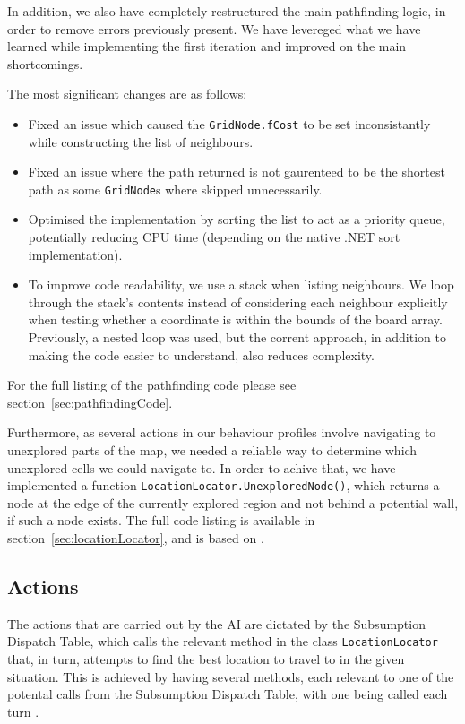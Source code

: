 \documentclass[11pt]{article}
\begin{document}
In addition, we also have completely restructured the main pathfinding logic, in order to remove errors previously present. We have levereged what we have learned while implementing the first iteration\cite{theGloriousWe} and improved on the main shortcomings.

The most significant changes are as follows:

\begin{itemize}
\item Fixed an issue which caused the \verb|GridNode.fCost| to be set inconsistantly while constructing the list of neighbours.
\item Fixed an issue where the path returned is not gaurenteed to be the shortest path as some \verb|GridNode|s where skipped unnecessarily.
\item Optimised the implementation by sorting the list to act as a priority queue, potentially reducing CPU time (depending on the native .NET sort implementation).
\item To improve code readability, we use a stack when listing neighbours. We loop through the stack's contents instead of considering each neighbour explicitly when testing whether a coordinate is within the bounds of the board array. Previously, a nested loop was used, but the corrent approach, in addition to making the code easier to understand, also reduces complexity.
\end{itemize}

For the full listing of the pathfinding code please see section~\ref{sec:pathfindingCode}.

Furthermore, as several actions in our behaviour profiles involve navigating to unexplored parts of the map, we needed a reliable way to determine which unexplored cells we could navigate to. In order to achive that, we have implemented a function \verb|LocationLocator.UnexploredNode()|, which returns a node at the edge of the currently explored region and not behind a potential wall, if such a node exists. The full code listing is available in section~\ref{sec:locationLocator}, and is based on \cite{denport}.

\subsection{Actions} \label{sec:actions}

The actions that are carried out by the AI are dictated by the Subsumption Dispatch Table, which calls the relevant method in the class \verb|LocationLocator| that, in turn, attempts to find the best location to travel to in the given situation. This is achieved by having several methods, each relevant to one of the potental calls from the Subsumption Dispatch Table, with one being called each turn .
\end{document}
